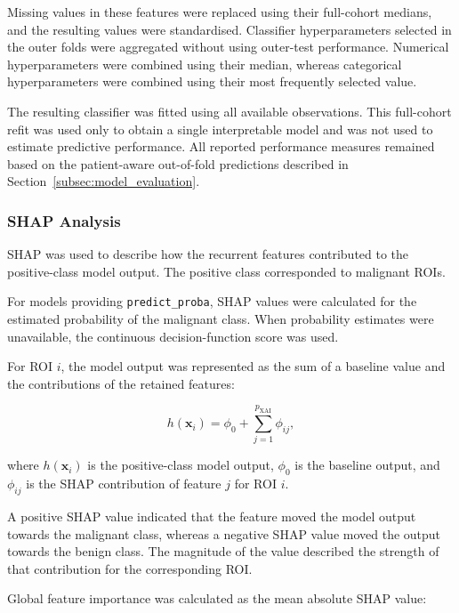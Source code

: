 \documentclass[12pt,twocolumn]{article}
\begin{document}
Missing values in these features were replaced using their
full-cohort medians, and the resulting values were standardised.
Classifier hyperparameters selected in the outer folds were aggregated
without using outer-test performance. Numerical hyperparameters were
combined using their median, whereas categorical hyperparameters were
combined using their most frequently selected value.

The resulting classifier was fitted using all available observations.
This full-cohort refit was used only to obtain a single interpretable
model and was not used to estimate predictive performance. All
reported performance measures remained based on the patient-aware
out-of-fold predictions described in
Section~\ref{subsec:model_evaluation}.





\subsubsection{SHAP Analysis}
\label{subsubsec:shap_analysis}

SHAP was used to describe how the recurrent features contributed to
the positive-class model output. The positive class corresponded to
malignant ROIs.

For models providing \texttt{predict\_proba}, SHAP values were
calculated for the estimated probability of the malignant class.
When probability estimates were unavailable, the continuous
decision-function score was used.

For ROI \(i\), the model output was represented as the sum of a
baseline value and the contributions of the retained features:

\begin{equation}
h(\mathbf{x}_i)
=
\phi_0
+
\sum_{j=1}^{p_{\mathrm{XAI}}}
\phi_{ij},
\label{eq:shap_additive_representation}
\end{equation}

where \(h(\mathbf{x}_i)\) is the positive-class model output,
\(\phi_0\) is the baseline output, and \(\phi_{ij}\) is the SHAP
contribution of feature \(j\) for ROI \(i\).

A positive SHAP value indicated that the feature moved the model output
towards the malignant class, whereas a negative SHAP value moved the
output towards the benign class. The magnitude of the value described
the strength of that contribution for the corresponding ROI.

Global feature importance was calculated as the mean absolute SHAP
value:
\end{document}
